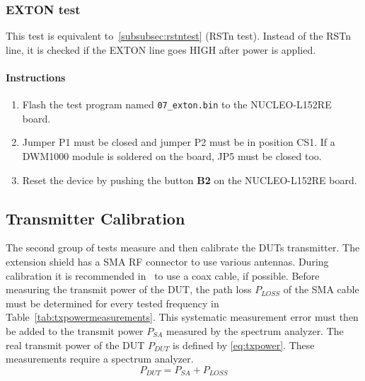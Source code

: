\documentclass[journal,comsoc]{IEEEtran}
\begin{document}
\vspace*{1em}
\subsubsection{EXTON test}
\label{subsubsec:extontest}
This test is equivalent to~\ref{subsubsec:rstntest} (RSTn test). Instead of the RSTn line, it is checked if the EXTON line goes HIGH after power is applied.
\paragraph{Instructions}
\begin{enumerate}
	\item Flash the test program named \texttt{07\_exton.bin} to the NUCLEO-L152RE board.
	\item Jumper P1 must be closed and jumper P2 must be in position CS1. If a DWM1000 module is soldered on the board, JP5 must be closed too.
	\item Reset the device by pushing the button \textbf{B2} on the NUCLEO-L152RE board.
\end{enumerate}

\subsection{Transmitter Calibration}
\label{subsec:transmittercalibration}
The second group of tests measure and then calibrate the DUTs transmitter. The extension shield has a SMA RF connector to use various antennas. During calibration it is recommended in~\cite{prodtest} to use a coax cable, if possible. Before measuring the transmit power of the DUT, the path loss $P_{LOSS}$ of the SMA cable must be determined for every tested frequency in Table~\ref{tab:txpowermeasurements}. This systematic measurement error must then be added to the transmit power $P_{SA}$ measured by the spectrum analyzer. The real transmit power of the DUT $P_{DUT}$ is defined by \eqref{eq:txpower}.
These measurements require a spectrum analyzer.
\begin{equation}
\label{eq:txpower}
P_{DUT} = P_{SA} + P_{LOSS}
\end{equation}

\vspace*{1em}
\end{document}
